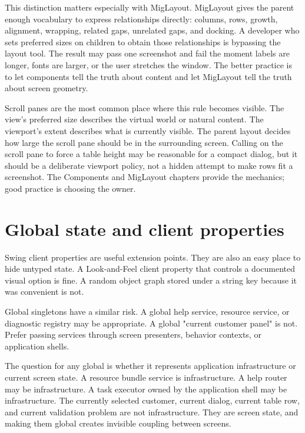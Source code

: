 This distinction matters especially with MigLayout. MigLayout gives the parent
enough vocabulary to express relationships directly: columns, rows, growth,
alignment, wrapping, related gaps, unrelated gaps, and docking. A developer who
sets preferred sizes on children to obtain those relationships is bypassing the
layout tool. The result may pass one screenshot and fail the moment labels are
longer, fonts are larger, or the user stretches the window. The better practice
is to let components tell the truth about content and let MigLayout tell the
truth about screen geometry.

Scroll panes are the most common place where this rule becomes visible. The
view's preferred size describes the virtual world or natural content. The
viewport's extent describes what is currently visible. The parent layout
decides how large the scroll pane should be in the surrounding screen. Calling
 on the scroll pane to force a table height may be
reasonable for a compact dialog, but it should be a deliberate viewport policy,
not a hidden attempt to make rows fit a screenshot. The Components and MigLayout
chapters provide the mechanics; good practice is choosing the owner.

\section{Global state and client properties}

Swing client properties are useful extension points. They are also an easy place to hide untyped state. A Look-and-Feel client property that controls a documented visual option is fine. A random object graph stored under a string key because it was convenient is not.

Global singletons have a similar risk. A global help service, resource service, or diagnostic registry may be appropriate. A global "current customer panel" is not. Prefer passing services through screen presenters, behavior contexts, or application shells.

The question for any global is whether it represents application infrastructure
or current screen state. A resource bundle service is infrastructure. A help
router may be infrastructure. A task executor owned by the application shell may
be infrastructure. The currently selected customer, current dialog, current
table row, and current validation problem are not infrastructure. They are
screen state, and making them global creates invisible coupling between
screens.

